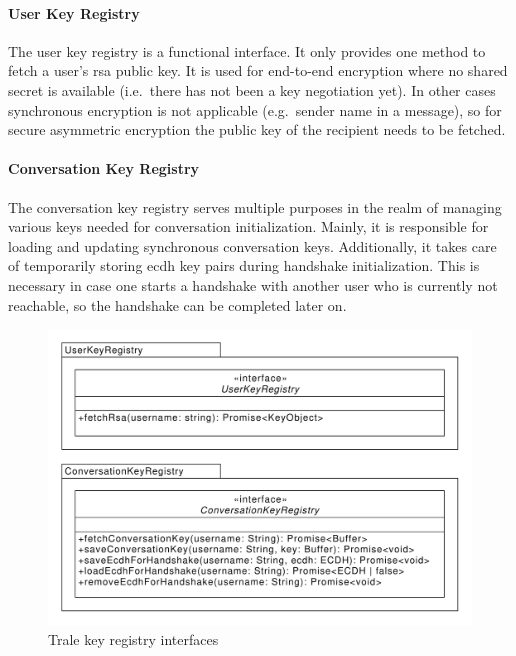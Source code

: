 \paragraph{User Key Registry}
The user key registry is a functional interface.
It only provides one method to fetch a user's \ac{rsa} public key.
It is used for end-to-end encryption where no shared secret is available (i.e.\ there has not been a key negotiation
yet).
In other cases synchronous encryption is not applicable (e.g.\ sender name in a message), so for secure asymmetric
encryption the public key of the recipient needs to be fetched.

\paragraph{Conversation Key Registry}
The conversation key registry serves multiple purposes in the realm of managing various keys needed for conversation
initialization.
Mainly, it is responsible for loading and updating synchronous conversation keys.
Additionally, it takes care of temporarily storing \ac{ecdh} key pairs during handshake initialization.
This is necessary in case one starts a handshake with another user who is currently not reachable, so the handshake can
be completed later on.

\begin{figure}[H]
    \centering
    \includegraphics[width=1.0\textwidth]{./graphics/classDiagramTransportLibraryDiverse}
    \vspace*{-0.5cm}
    \caption{Trale key registry interfaces}
    \label{fig:figure34}
\end{figure}

